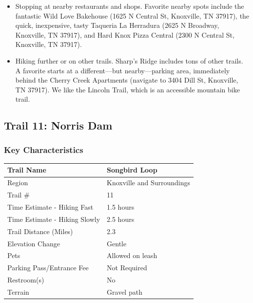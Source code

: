 \documentclass[
  letterpaper,
  DIV=11,
  numbers=noendperiod]{scrartcl}
\providecommand{\tightlist}{%
  \setlength{\itemsep}{0pt}\setlength{\parskip}{0pt}}\usepackage{longtable,booktabs,array}
\begin{document}
\begin{itemize}
\tightlist
\item
  Stopping at nearby restaurants and shops. Favorite nearby spots
  include the fantastic Wild Love Bakehouse (1625 N Central St,
  Knoxville, TN 37917), the quick, inexpensive, tasty Taqueria La
  Herradura (2625 N Broadway, Knoxville, TN 37917), and Hard Knox Pizza
  Central (2300 N Central St, Knoxville, TN 37917).
\item
  Hiking further or on other trails. Sharp's Ridge includes tons of
  other trails. A favorite starts at a different---but nearby---parking
  area, immediately behind the Cherry Creek Apartments (navigate to 3404
  Dill St, Knoxville, TN 37917). We like the Lincoln Trail, which is an
  accessible mountain bike trail.
\end{itemize}

\hypertarget{trail-11-norris-dam}{%
\subsection{Trail 11: Norris Dam}\label{trail-11-norris-dam}}

\hypertarget{key-characteristics-10}{%
\subsubsection{Key Characteristics}\label{key-characteristics-10}}

\begin{longtable}[]{@{}ll@{}}
\toprule\noalign{}
Trail Name & Songbird Loop \\
\midrule\noalign{}
\endhead
\bottomrule\noalign{}
\endlastfoot
Region & Knoxville and Surroundings \\
Trail \# & 11 \\
Time Estimate - Hiking Fast & 1.5 hours \\
Time Estimate - Hiking Slowly & 2.5 hours \\
Trail Distance (Miles) & 2.3 \\
Elevation Change & Gentle \\
Pets & Allowed on leash \\
Parking Pass/Entrance Fee & Not Required \\
Restroom(s) & No \\
Terrain & Gravel path \\
\end{longtable}
\end{document}
